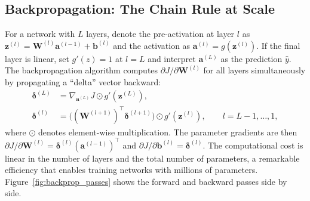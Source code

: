 \documentclass[11pt,a4paper]{report}
\newcommand{\bb}{\bm{b}}
\newcommand{\z}{\bm{z}}
\newcommand{\W}{\bm{W}}
\renewcommand{\a}{\bm{a}}
\begin{document}
\subsection{Backpropagation: The Chain Rule at Scale}

For a network with $L$ layers, denote the pre-activation at layer $l$ as $\z^{(l)} = \W^{(l)}\a^{(l-1)} + \bb^{(l)}$ and the activation as $\a^{(l)} = g(\z^{(l)})$.  If the final layer is linear, set $g'(z)=1$ at $l=L$ and interpret $\a^{(L)}$ as the prediction $\hat y$.  The backpropagation algorithm computes $\partial J / \partial \W^{(l)}$ for all layers simultaneously by propagating a ``delta'' vector backward:
\begin{align}
\bm{\delta}^{(L)} &= \nabla_{\a^{(L)}} J \odot g'(\z^{(L)}), \\
\bm{\delta}^{(l)} &= \bigl((\W^{(l+1)})^\top \bm{\delta}^{(l+1)}\bigr) \odot g'(\z^{(l)}), \qquad l = L-1, \ldots, 1,
\end{align}
where $\odot$ denotes element-wise multiplication.  The parameter gradients are then $\partial J / \partial \W^{(l)} = \bm{\delta}^{(l)} (\a^{(l-1)})^\top$ and $\partial J / \partial \bb^{(l)} = \bm{\delta}^{(l)}$.  The computational cost is linear in the number of layers and the total number of parameters, a remarkable efficiency that enables training networks with millions of parameters.  Figure~\ref{fig:backprop_passes} shows the forward and backward passes side by side.
\end{document}
